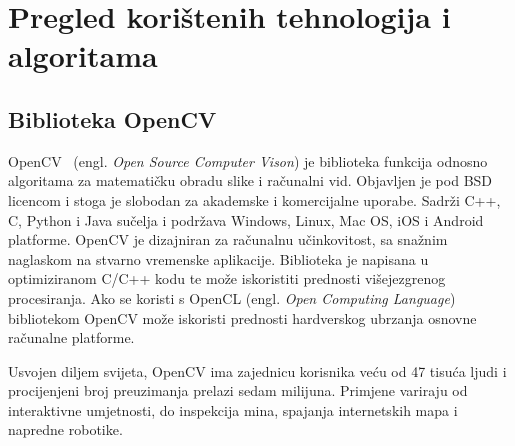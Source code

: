 \newpage
\setcounter{figure}{0}

\section{Pregled korištenih tehnologija i algoritama} %
\label{sec:Tehnologija i teorija}

\subsection{Biblioteka OpenCV} %
\label{sub:Biblioteka OpenCV}

OpenCV~\cite{opencv_library} (engl. \textit{Open Source Computer Vison})
je biblioteka funkcija odnosno algoritama za matematičku obradu slike i
računalni vid.  Objavljen je pod BSD licencom i stoga je slobodan za
akademske i komercijalne uporabe. Sadrži C++, C, Python i Java sučelja i
podržava Windows, Linux, Mac OS, iOS i Android platforme. OpenCV je
dizajniran za računalnu učinkovitost, sa snažnim naglaskom na stvarno
vremenske aplikacije. Biblioteka je napisana u optimiziranom C/C++ kodu
te može iskoristiti prednosti višejezgrenog procesiranja. Ako se koristi
s OpenCL (engl. \textit{Open Computing Language}) bibliotekom OpenCV
može iskoristi prednosti hardverskog ubrzanja osnovne računalne
platforme.

Usvojen diljem svijeta, OpenCV ima zajednicu korisnika veću od 47 tisuća
ljudi i procijenjeni broj preuzimanja prelazi sedam milijuna. Primjene
variraju od interaktivne umjetnosti, do inspekcija mina, spajanja
internetskih mapa i napredne robotike.

